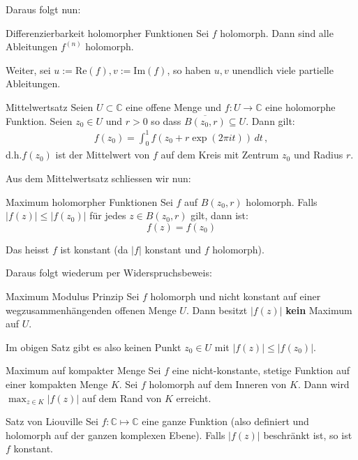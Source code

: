 \documentclass[a4paper,10pt]{article}
\def\C{\mathbb{C}}
\def\Re{\text{Re}}
\def\Im{\text{Im}}
\begin{document}
Daraus folgt nun:

\begin{subbox}{Differenzierbarkeit holomorpher Funktionen}
  Sei $f$ holomorph. Dann sind alle Ableitungen $f^{(n)}$ holomorph.

  Weiter, sei $u := \Re(f), v := \Im(f)$, so haben $u, v$ unendlich viele partielle Ableitungen.
\end{subbox}

\begin{mainbox}{Mittelwertsatz}
  Seien \(U\subset\mathbb{C}\) eine offene Menge und \(f \colon U \to \mathbb{C}\) eine holomorphe Funktion. Seien \(z_0 \in U\) und \(r > 0\) so dass \(\overline{B(z_0,r)} \subseteq U\). Dann gilt:
  \begin{align*} f(z_0) = \int_0^1 f(z_0 + r \exp(2 \pi i t))\, dt\,, \end{align*} d.h.\(f(z_0)\) ist der Mittelwert von \(f\) auf dem Kreis mit Zentrum \(z_0\) und Radius \(r\).
\end{mainbox}

Aus dem Mittelwertsatz schliessen wir nun:

\begin{subbox}{Maximum holomorpher Funktionen}
  Sei $f$ auf $B(z_0, r)$ holomorph. Falls $|f(z)| \leq |f(z_0)|$ für jedes $z \in B(z_0, r)$ gilt, dann ist:
  $$
    f(z) = f(z_0)
  $$

  Das heisst $f$ ist konstant (da $|f|$ konstant und $f$ holomorph).
\end{subbox}

Daraus folgt wiederum per Widerspruchsbeweis:

\begin{mainbox}{Maximum Modulus Prinzip}
  Sei $f$ holomorph und nicht konstant auf einer wegzusammenhängenden offenen Menge $U$. Dann besitzt $|f(z)|$ \textbf{kein} Maximum auf $U$.
\end{mainbox}

Im obigen Satz gibt es also keinen Punkt $z_0 \in U$ mit $|f(z)| \leq |f(z_0)|$.

\begin{subbox}{Maximum auf kompakter Menge}
  Sei $f$ eine nicht-konstante, stetige Funktion auf  einer kompakten Menge $K$. Sei $f$ holomorph auf dem Inneren von $K$. Dann wird $\max_{z \in K} |f(z)|$ auf dem Rand von $K$ erreicht.
\end{subbox}

\begin{mainbox}{Satz von Liouville}
  Sei $f: \C \mapsto \C$ eine ganze Funktion (also definiert und holomorph auf der ganzen komplexen Ebene). Falls $|f(z)|$ beschränkt ist, so ist $f$ konstant.
\end{mainbox}
\end{document}
